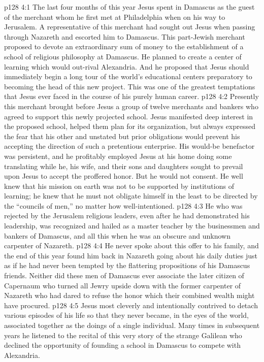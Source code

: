 \vs p128 4:1 The last four months of this year Jesus spent in Damascus as the guest of the merchant whom he first met at Philadelphia when on his way to Jerusalem. A representative of this merchant had sought out Jesus when passing through Nazareth and escorted him to Damascus. This part\hyp{}Jewish merchant proposed to devote an extraordinary sum of money to the establishment of a school of religious philosophy at Damascus. He planned to create a center of learning which would out\hyp{}rival Alexandria. And he proposed that Jesus should immediately begin a long tour of the world’s educational centers preparatory to becoming the head of this new project. This was one of the greatest temptations that Jesus ever faced in the course of his purely human career.
\vs p128 4:2 Presently this merchant brought before Jesus a group of twelve merchants and bankers who agreed to support this newly projected school. Jesus manifested deep interest in the proposed school, helped them plan for its organization, but always expressed the fear that his other and unstated but prior obligations would prevent his accepting the direction of such a pretentious enterprise. His would\hyp{}be benefactor was persistent, and he profitably employed Jesus at his home doing some translating while he, his wife, and their sons and daughters sought to prevail upon Jesus to accept the proffered honor. But he would not consent. He well knew that his mission on earth was not to be supported by institutions of learning; he knew that he must not obligate himself in the least to be directed by the “councils of men,” no matter how well\hyp{}intentioned.
\vs p128 4:3 He who was rejected by the Jerusalem religious leaders, even after he had demonstrated his leadership, was recognized and hailed as a master teacher by the businessmen and bankers of Damascus, and all this when he was an obscure and unknown carpenter of Nazareth.
\vs p128 4:4 He never spoke about this offer to his family, and the end of this year found him back in Nazareth going about his daily duties just as if he had never been tempted by the flattering propositions of his Damascus friends. Neither did these men of Damascus ever associate the later citizen of Capernaum who turned all Jewry upside down with the former carpenter of Nazareth who had dared to refuse the honor which their combined wealth might have procured.
\pc \vs p128 4:5 Jesus most cleverly and intentionally contrived to detach various episodes of his life so that they never became, in the eyes of the world, associated together as the doings of a single individual. Many times in subsequent years he listened to the recital of this very story of the strange Galilean who declined the opportunity of founding a school in Damascus to compete with Alexandria.\plusone
